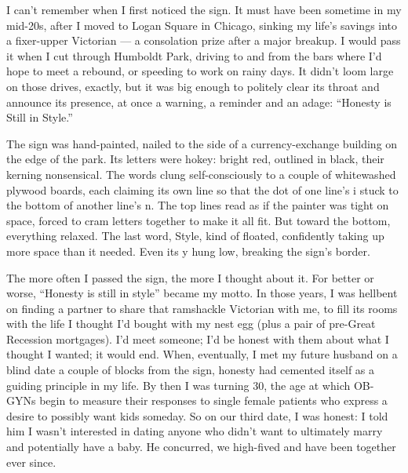 I can't remember when I first noticed the sign. It must have been
sometime in my mid-20s, after I moved to Logan Square in Chicago,
sinking my life's savings into a fixer-upper Victorian --- a consolation
prize after a major breakup. I would pass it when I cut through Humboldt
Park, driving to and from the bars where I'd hope to meet a rebound, or
speeding to work on rainy days. It didn't loom large on those drives,
exactly, but it was big enough to politely clear its throat and announce
its presence, at once a warning, a reminder and an adage: ``Honesty is
Still in Style.''

The sign was hand-painted, nailed to the side of a currency-exchange
building on the edge of the park. Its letters were hokey: bright red,
outlined in black, their kerning nonsensical. The words clung
self-consciously to a couple of whitewashed plywood boards, each
claiming its own line so that the dot of one line's i stuck to the
bottom of another line's n. The top lines read as if the painter was
tight on space, forced to cram letters together to make it all fit. But
toward the bottom, everything relaxed. The last word, Style, kind of
floated, confidently taking up more space than it needed. Even its y
hung low, breaking the sign's border.

The more often I passed the sign, the more I thought about it. For
better or worse, ``Honesty is still in style'' became my motto. In those
years, I was hellbent on finding a partner to share that ramshackle
Victorian with me, to fill its rooms with the life I thought I'd bought
with my nest egg (plus a pair of pre-Great Recession mortgages). I'd
meet someone; I'd be honest with them about what I thought I wanted; it
would end. When, eventually, I met my future husband on a blind date a
couple of blocks from the sign, honesty had cemented itself as a guiding
principle in my life. By then I was turning 30, the age at which OB-GYNs
begin to measure their responses to single female patients who express a
desire to possibly want kids someday. So on our third date, I was
honest: I told him I wasn't interested in dating anyone who didn't want
to ultimately marry and potentially have a baby. He concurred, we
high-fived and have been together ever since.

